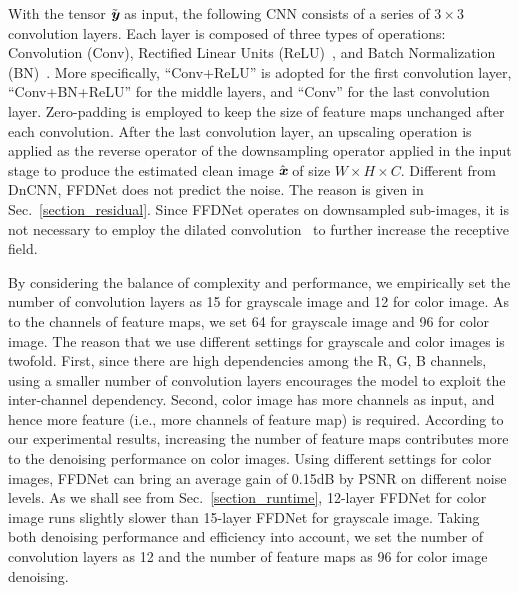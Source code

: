 \documentclass[journal]{IEEEtran}
\begin{document}
With the tensor $\tilde{\emph{\textbf{y}}}$ as input, the following CNN consists of a series of $3\times3$ convolution layers.
Each layer is composed of three types of operations: Convolution (Conv), Rectified Linear Units (ReLU)~\cite{krizhevsky2012imagenet}, and Batch Normalization (BN)~\cite{ioffe2015batch}.
More specifically, ``Conv+ReLU'' is adopted for the first convolution layer, ``Conv+BN+ReLU'' for the middle layers, and ``Conv'' for the last convolution layer.
Zero-padding is employed to keep the size of feature maps unchanged after each convolution. After the last convolution layer, an upscaling operation is applied as the reverse operator of the downsampling operator applied in the input stage to produce the estimated clean image $\hat{\emph{\textbf{x}}}$ of size $W\times H \times C$.
Different from DnCNN, FFDNet does not predict the noise. The reason is given in Sec.~\ref{section_residual}.
Since FFDNet operates on downsampled sub-images, it is not necessary to employ the dilated convolution~\cite{yu2015multi} to further increase the receptive field.

By considering the balance of complexity and performance, we empirically set the number of convolution layers as 15 for grayscale image and 12 for color image. As to the channels of feature maps, we set 64 for grayscale image and 96 for color image. The reason that we use different settings for grayscale and color images is twofold.
First, since there are high dependencies among the R, G, B channels, using a smaller number of convolution layers encourages the model to exploit the inter-channel dependency.
Second, color image has more channels as input, and hence more feature (i.e., more channels of feature map) is required.
According to our experimental results, increasing the number of feature maps contributes more to the denoising performance on color images. Using different settings for color images, FFDNet can bring an average gain of 0.15dB by PSNR on different noise levels.
As we shall see from Sec.~\ref{section_runtime}, 12-layer FFDNet for color image runs slightly slower than 15-layer FFDNet for grayscale image. Taking both denoising performance and efficiency into account, we set the number of convolution layers as 12 and the number of feature maps as 96 for color image denoising.
\end{document}
